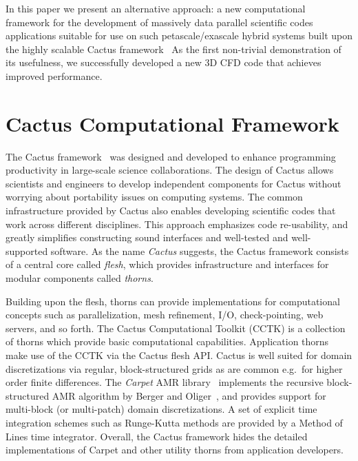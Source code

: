 \documentclass{IOS-Book-Article}
\begin{document}
In this paper we present an alternative approach: a
new computational framework
for the development of massively data parallel
scientific codes
applications suitable for use on such petascale/exascale hybrid systems built 
upon the highly
scalable Cactus framework~\cite{CS_Goodale02a, CS_Cactusweb}
As the first non-trivial
demonstration of its usefulness, we successfully developed a new 3D CFD code
that achieves improved performance.


\section{Cactus Computational Framework}
The Cactus framework~\cite{CS_Goodale02a, CS_Cactusweb} was designed
and developed to enhance programming
productivity in large-scale science collaborations.  The design of
Cactus allows scientists and engineers to develop independent components for
Cactus without worrying about portability issues on computing systems. The
common infrastructure provided by Cactus also enables developing
scientific codes that work across different disciplines. This approach emphasizes code
re-usability, and greatly simplifies constructing sound interfaces and
well-tested and well-supported software. As the name \emph{Cactus} suggests,
the Cactus framework consists of a central core called \emph{flesh}, which
provides infrastructure and interfaces for modular components called
\emph{thorns}.

Building upon the flesh, thorns can provide implementations for
computational concepts
such as parallelization,
mesh refinement, I/O, check-pointing, web servers, and so forth. The Cactus
Computational Toolkit (CCTK) is a collection of thorns which provide basic
computational capabilities. Application thorns make use of the CCTK via
the Cactus flesh API\@.
Cactus is well suited for domain discretizations via regular,
block-structured grids as are common e.g.\ for higher order finite
differences.
The \emph{Carpet} AMR library~\cite{CS_Schnetter-etal-03b,
CS_carpet_web} implements the recursive block-structured AMR
algorithm by Berger and Oliger~\cite{CS_Berger84}, and provides
support for multi-block (or multi-patch) domain discretizations.
A set of explicit time integration schemes such as
Runge-Kutta methods are provided by a Method of Lines time integrator.
Overall, the Cactus framework hides the detailed implementations of
Carpet and other utility thorns from application developers.
\end{document}
